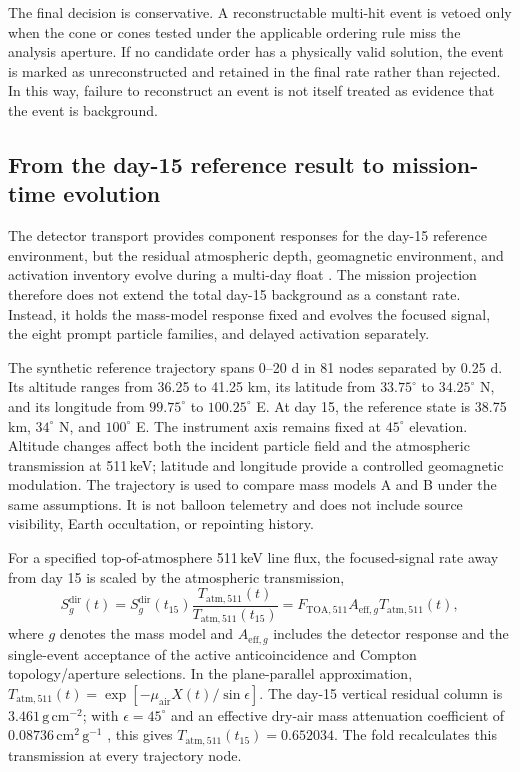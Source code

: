 \documentclass[11pt]{article}
\begin{document}
The final decision is conservative. A reconstructable multi-hit event is vetoed
only when the cone or cones tested under the applicable ordering rule miss the
analysis aperture. If no candidate order has a physically valid solution, the
event is marked as unreconstructed and retained in the final rate rather than
rejected. In this way, failure to reconstruct an event is not itself treated as
evidence that the event is background.

\subsection{From the day-15 reference result to mission-time evolution}
\label{sec:mission_time_fold}

The detector transport provides component responses for the day-15 reference
environment, but the residual atmospheric depth, geomagnetic environment, and
activation inventory evolve during a multi-day float
\cite{Gallego2025Balloon,Kierans2017}. The mission projection therefore does not
extend the total day-15 background as a constant rate. Instead, it holds the
mass-model response fixed and evolves the focused signal, the eight prompt
particle families, and delayed activation separately.

The synthetic reference trajectory spans 0--20 d in 81 nodes separated by
0.25 d. Its altitude ranges from 36.25 to 41.25 km, its latitude from
$33.75^\circ$ to $34.25^\circ$ N, and its longitude from $99.75^\circ$ to
$100.25^\circ$ E. At day 15, the reference state is 38.75 km,
$34^\circ$ N, and $100^\circ$ E. The instrument axis remains fixed at
$45^\circ$ elevation. Altitude changes affect both the incident
particle field and the atmospheric transmission at 511\,keV; latitude and
longitude provide a controlled geomagnetic modulation. The trajectory is used
to compare mass models A and B under the same assumptions. It is not balloon
telemetry and does not include source visibility, Earth occultation, or
repointing history.

For a specified top-of-atmosphere 511\,keV line flux, the focused-signal rate
away from day 15 is scaled by the atmospheric transmission,
\begin{equation}
 S^{\mathrm{dir}}_g(t)
 =S^{\mathrm{dir}}_g(t_{15})
 \frac{T_{\mathrm{atm},511}(t)}{T_{\mathrm{atm},511}(t_{15})}
 =F_{\mathrm{TOA},511}A_{\mathrm{eff},g}T_{\mathrm{atm},511}(t),
 \label{eq:mission_signal}
\end{equation}
where $g$ denotes the mass model and $A_{\mathrm{eff},g}$ includes the detector
response and the single-event acceptance of the active anticoincidence and
Compton topology/aperture selections. In the plane-parallel approximation,
$T_{\mathrm{atm},511}(t)=\exp[-\mu_{\mathrm{air}}X(t)/\sin\epsilon]$. The
day-15 vertical residual column is $3.461\,\mathrm{g\,cm^{-2}}$; with
$\epsilon=45^\circ$ and an effective dry-air mass attenuation coefficient of
$0.08736\,\mathrm{cm^2\,g^{-1}}$ \cite{NISTXCOM}, this gives
$T_{\mathrm{atm},511}(t_{15})=0.652034$. The fold recalculates this transmission
at every trajectory node.
\end{document}
